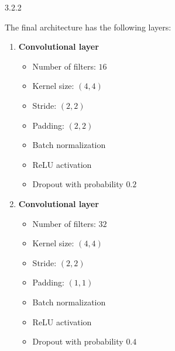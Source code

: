 \begin{task}{3.2.2}
\end{task}

The final architecture has the following layers:\\[0.5em]
\begin{minipage}[t]{0.48\linewidth}
  \begin{enumerate}
    \item \textbf{Convolutional layer}
          \begin{itemize}
            \item Number of filters: $16$
            \item Kernel size: $(4, 4)$
            \item Stride: $(2, 2)$
            \item Padding: $(2, 2)$
            \item Batch normalization
            \item ReLU activation
            \item Dropout with probability $0.2$
          \end{itemize}
    \item \textbf{Convolutional layer}
          \begin{itemize}
            \item Number of filters: $32$
            \item Kernel size: $(4, 4)$
            \item Stride: $(2, 2)$
            \item Padding: $(1, 1)$
            \item Batch normalization
            \item ReLU activation
            \item Dropout with probability $0.4$
          \end{itemize}
  \end{enumerate}
\end{minipage}
